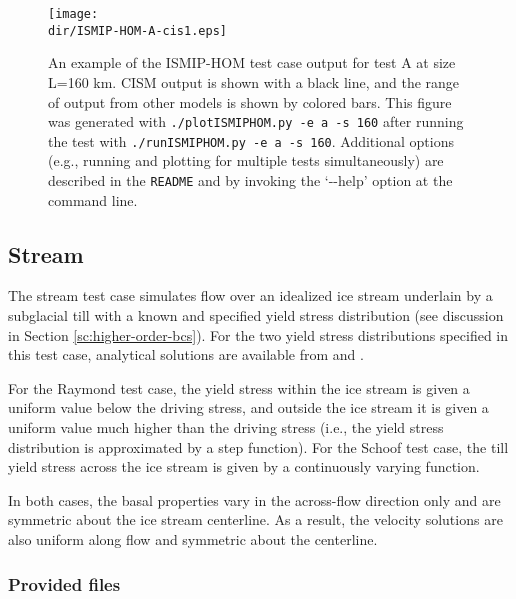 \begin{figure}[H!]
	\centering
	\texttt{[image: \\dir/ISMIP-HOM-A-cis1.eps]}
	\caption{An example of the ISMIP-HOM test case output for test A at size L=160 km. 
CISM output is shown with a black line, and the range of output from other models is shown by colored bars. 
This figure was generated with \texttt{./plotISMIPHOM.py -e a -s 160} after running the test with \texttt{./runISMIPHOM.py -e a -s 160}.
Additional options (e.g., running and plotting for multiple tests simultaneously) are described in the \texttt{README} and by invoking the
`-{}-help' option at the command line.}
	\label{fig:ismiphom-results}
\end{figure}
\FloatBarrier

\subsection{Stream}
\label{sc:stream_test}
The stream test case simulates flow over an idealized ice stream underlain by a subglacial till with a known and specified
yield stress distribution (see discussion in Section \ref{sc:higher-order-bcs}). For the two yield stress distributions specified in this test case, 
analytical solutions are available from \citet{Raymond2000} and \citet{Schoof2006}. 

For the Raymond test case, the yield stress within the ice stream is given a uniform value below the driving stress, and outside the
ice stream it is given a uniform value much higher than the driving stress (i.e., the yield stress distribution is approximated by a
step function). For the Schoof test case, the till yield stress across the ice stream is given by a continuously varying function.

In both cases, the basal properties vary in the across-flow direction only and are symmetric about the ice stream centerline.
As a result, the velocity solutions are also uniform along flow and symmetric about the centerline.

\subsubsection{Provided files}

